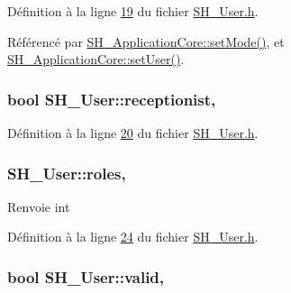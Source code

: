 Définition à la ligne \hyperlink{SH__User_8h_source_l00019}{19} du fichier \hyperlink{SH__User_8h_source}{S\-H\-\_\-\-User.\-h}.



Référencé par \hyperlink{classSH__ApplicationCore_a2bfe19528b27831332559d5d2cd24d25}{S\-H\-\_\-\-Application\-Core\-::set\-Mode()}, et \hyperlink{classSH__ApplicationCore_a2dd5c029a2ea348f1dfd0a60dea476e4}{S\-H\-\_\-\-Application\-Core\-::set\-User()}.

\hypertarget{classSH__User_ad9970fff1a6be03101fd87f9c60081ee}{
\subsubsection[{receptionist}]{\setlength{\rightskip}{0pt plus 5cm}bool S\-H\-\_\-\-User\-::receptionist\hspace{0.3cm}{\ttfamily [read]}, {\ttfamily [inherited]}}}\label{classSH__User_ad9970fff1a6be03101fd87f9c60081ee}


Définition à la ligne \hyperlink{SH__User_8h_source_l00020}{20} du fichier \hyperlink{SH__User_8h_source}{S\-H\-\_\-\-User.\-h}.

\hypertarget{classSH__User_af21eafacfa21aa325f7e68a065ce14de}{
\subsubsection[{roles}]{\setlength{\rightskip}{0pt plus 5cm}S\-H\-\_\-\-User\-::roles\hspace{0.3cm}{\ttfamily [read]}, {\ttfamily [inherited]}}}\label{classSH__User_af21eafacfa21aa325f7e68a065ce14de}
\begin{DoxyReturn}{Renvoie}
int 
\end{DoxyReturn}


Définition à la ligne \hyperlink{SH__User_8h_source_l00024}{24} du fichier \hyperlink{SH__User_8h_source}{S\-H\-\_\-\-User.\-h}.

\hypertarget{classSH__User_a91cae1175894bf2eef629405638db01c}{
\subsubsection[{valid}]{\setlength{\rightskip}{0pt plus 5cm}bool S\-H\-\_\-\-User\-::valid\hspace{0.3cm}{\ttfamily [read]}, {\ttfamily [inherited]}}}\label{classSH__User_a91cae1175894bf2eef629405638db01c}


